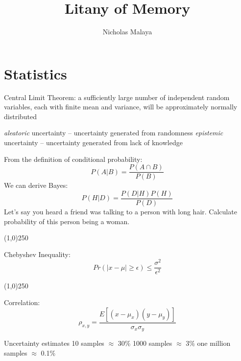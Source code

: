 \documentclass{article}
\title{\bf{Litany of Memory}}
\author{Nicholas Malaya} \date{}
\begin{document}
\maketitle

%
%
\newpage
\section{Statistics}

Central Limit Theorem: a sufficiently large number of independent random variables, 
each with finite mean and variance, will be approximately normally distributed
\newline
\newline

\emph{aleatoric} uncertainty -- uncertainty generated from randomness
\newline
\newline
\emph{epistemic} uncertainty -- uncertainty generated from lack of knowledge
\newline
\newline

From the definition of conditional probability:
\begin{equation}
  P(A|B) = \frac{P(A \cap B) }{P(B)}
\end{equation}
We can derive Bayes:
\begin{equation}
  P(H|D) = \frac{P(D|H) P(H) }{P(D)}
\end{equation}
Let's say you heard a friend was talking to a person with long hair. Calculate probability of this person being a woman.

\begin{center}
\line(1,0){250}
\end{center}

Chebyshev Inequality:
\begin{equation}
  Pr(|x-\mu| \ge \epsilon) \le \frac{\sigma^2}{\epsilon^2}
\end{equation}

\begin{center}
\line(1,0){250}
\end{center}

Correlation:
\begin{equation}
  \rho_{x,y} = \frac{E[(x-\mu_x)(y-\mu_y)]}{\sigma_x \sigma_y}
\end{equation}

Uncertainty estimates
10 samples $\approx$ 30\%
1000 samples $\approx$ 3\%
one million samples $\approx$ 0.1\%
\end{document}
